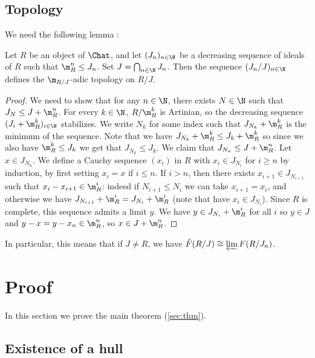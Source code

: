 \section{Topology}

We need the following lemma
\cite[\href{https://stacks.math.columbia.edu/tag/06SE}{Tag 06SE}]{stacks-project}:
\begin{lemma}
  \label{lem:topo}
  \leanok
  Let $R$ be an object of $\Chat$, and let $(J_n)_{n\in\N}$ be a decreasing
  sequence of ideals of $R$ such that $\m_R^n \le J_n$.
  Set $J = \bigcap_{n\in\N} J_n$.
  Then the sequence $(J_n/J)_{n\in\N}$ defines the $\m_{R/J}$-adic
  topology on $R/J$.
\end{lemma}

\begin{proof}
  \leanok
  We need to show that for any $n \in \N$, there exists $N\in\N$ such
  that $J_N \le J + \m_R^n$. For every $k \in \N$, $R / \m_R^k$
  is Artinian, so the decreasing sequence $(J_i + \m_R^k)_{i \in \N}$
  stabilizes. We write $N_k$ for some index such that $J_{N_k} + \m_R^k$
  is the minimum of the sequence.
  Note that we have
  $J_{N_k} + \m_R^k \le J_k + \m_R^k$ so since we also have
  $\m_R^k \le J_k$ we get that $J_{N_k} \le J_k$.
  We claim that $J_{N_n} \le J + \m_R^n$.
  Let $x \in J_{N_n}$. We define a Cauchy sequence $(x_i)$ in $R$ with
  $x_i \in J_{N_i}$ for $i \ge n$
  by induction, by first setting $x_i = x$ if $i \le n$.
  If $i > n$, then there exists
  $x_{i+1} \in J_{N_{i+1}}$ such that $x_i - x_{i+1} \in \m_R ^ i$:
  indeed
  if $N_{i+1} \le N_i$ we can take $x_{i+1}= x_i$, and otherwise we have
  $J_{N_{i+1}} + \m_R^i = J_{N_i} + \m_R^i$ (note that have $x_i \in J_{N_i}$).
  Since $R$ is complete, this sequence admits a limit $y$.
  We have $y \in J_{N_i} + \m_R^i$ for all $i$ so $y \in J$ and
  $y - x = y - x_n \in \m_R ^ n$, so $x \in J + \m_R^n$.
\end{proof}

In particular, this means that if $J \ne R$, we have
$\hat{F}(R/J) \cong \varprojlim F(R / J_n)$.

\chapter{Proof}
\label{sec:proof}

In this section we prove the main theorem (\cref{sec:thm}).

\section{Existence of a hull}
\label{mainproof}

